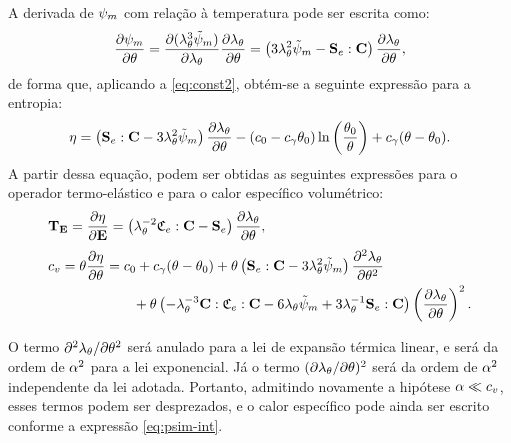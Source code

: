 \documentclass[Tese.tex]{subfiles}
\begin{document}
A derivada de $\psi_m$ com relação à temperatura pode ser escrita como:
\begin{equation}
\dfrac{\partial\psi_m}{\partial\theta} = \dfrac{\partial(\lambda_{\theta}^3\tilde{\psi}_m)}{\partial\lambda_{\theta}}\dfrac{\partial\lambda_{\theta}}{\partial\theta} = \left(3\lambda_{\theta}^2\tilde{\psi}_m-\mathbf{S}_e:\mathbf{C}\right)\dfrac{\partial\lambda_{\theta}}{\partial\theta},
\end{equation}
de forma que, aplicando a \cref{eq:const2}, obtém-se a seguinte expressão para a entropia:
\begin{equation}
\eta = \left(\mathbf{S}_e:\mathbf{C}-3\lambda_{\theta}^2\tilde{\psi}_m\right)\dfrac{\partial\lambda_{\theta}}{\partial\theta}-(c_0-c_{\gamma}\theta_0)\ln\left(\dfrac{\theta_0}{\theta}\right)+c_{\gamma}(\theta-\theta_0).
\end{equation}
A partir dessa equação, podem ser obtidas as seguintes expressões para o operador termo-elástico e para o calor específico volumétrico:
\begin{align}
&\operadorTermoElastico = \dfrac{\partial\entropy}{\partial\E} = \left(\alongTermico^{-2}\CCe:\C - \Se\right)\dfrac{\partial\alongTermico}{\partial\temp}, \\[0.1cm]
&\volumetricHeatCapacity = \temp\dfrac{\partial\entropy}{\partial\temp} = \specificHeatIni+\specificHeatConst(\temp - \tempref) + \temp\left(\Se:\C-3\alongTermico^2\helmholtzmInt\right)\dfrac{\partial^2\alongTermico}{\partial\temp^2} \\
&\phantom{\specificHeat = \massi\temp\dfrac{\partial\entropy}{\partial\temp} =}+ \temp\left(-\alongTermico^{-3}\C:\CCe:\C-6\alongTermico\helmholtzmInt+3\alongTermico^{-1}\Se:\C\right)\left(\dfrac{\partial\alongTermico}{\partial\temp}\right)^2.
\end{align}

O termo $\partial^2\lambda_{\theta}/\partial\theta^2$ será anulado para a lei de expansão térmica linear, e será da ordem de $\alpha^2$ para a lei exponencial. Já o termo $(\partial\lambda_{\theta}/\partial\theta)^2$ será da ordem de $\alpha^2$ independente da lei adotada. Portanto, admitindo novamente a hipótese $\alpha \ll c_v$, esses termos podem ser desprezados, e o calor específico pode ainda ser escrito conforme a expressão \eqref{eq:psim-int}.

%
\end{document}
